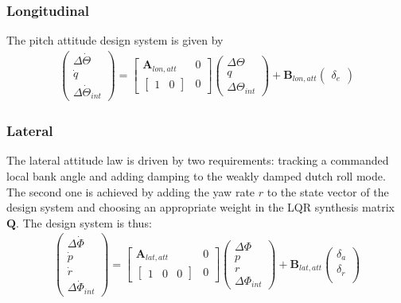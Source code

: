 \documentclass{ifacconf}
\newcommand{\mbf}[1]{\mathbf{#1}}
\providecommand{\mbf}[1]{\mathbf{#1}}
\begin{document}
\subsubsection{Longitudinal}
The pitch attitude design system is given by
\begin{align}
\begin{pmatrix}
\Delta \dot{\Theta} \\
\dot{q} \\
\Delta \dot{\Theta}_{int} 
\end{pmatrix}
=
\begin{bmatrix}
\mbf{
A
}_{lon, att} 
& 
0
\\
\begin{bmatrix}
1 & 0
\end{bmatrix}
& 
0
\end{bmatrix}
\begin{pmatrix}
\Delta {\Theta} \\
{q} \\
\Delta {\Theta}_{int} 
\end{pmatrix}
+
\mbf{
B
}_{lon, att}
\begin{pmatrix}
\delta_{e}
\end{pmatrix}
\end{align}
\subsubsection{Lateral}
The lateral attitude law is driven by two requirements: tracking a commanded local bank angle and adding damping to the weakly damped dutch roll mode. The second one is achieved by adding the yaw rate $r$ to the state vector of the design system and choosing an appropriate weight in the LQR synthesis matrix $\mbf{Q}$. The design system is thus:
\begin{align}
\begin{pmatrix}
\Delta \dot{\Phi} \\
\dot{p} \\
\dot{r} \\
\Delta \dot{\Phi}_{int} 
\end{pmatrix}
=
\begin{bmatrix}
\mbf{
A
}_{lat, att} 
& 
0
\\
\begin{bmatrix}
1 & 0 & 0
\end{bmatrix}
& 
0
\end{bmatrix}
\begin{pmatrix}
\Delta {\Phi} \\
{p} \\
{r} \\
\Delta {\Phi}_{int} 
\end{pmatrix}
+
\mbf{
B
}_{lat, att}
\begin{pmatrix}
\delta_a \\
\delta_r \\
\end{pmatrix}
\end{align}
\end{document}
